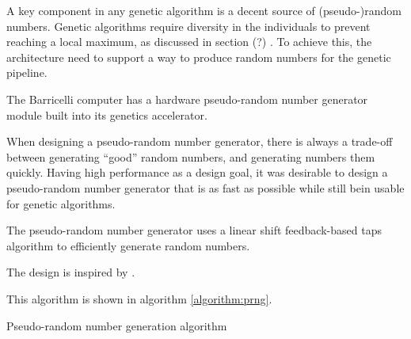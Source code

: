 A key component in any genetic algorithm is a decent source of (pseudo-)random numbers.
Genetic algorithms require diversity in the individuals to prevent reaching a local maximum, as discussed in section (?) . 
To achieve this, the architecture need to support a way to produce random numbers for the genetic pipeline.   

The Barricelli computer has a hardware pseudo-random number generator module built into its genetics accelerator.

When designing a pseudo-random number generator, there is always a trade-off between generating ``good'' random numbers, and generating numbers them quickly.
Having high performance as a design goal\cn, it was desirable to design a pseudo-random number generator that is as fast as possible while still bein usable for genetic algorithms.

The pseudo-random number generator uses a linear shift feedback-based taps algorithm to efficiently generate random numbers.

The design is inspired by .

This algorithm is shown in algorithm \vref{algorithm:prng}.

\begin{algorithm}[H]
\SetAlgoLined
\DontPrintSemicolon
{}
\caption{Pseudo-random number generation algorithm}
\label{algorithm:prng}
\end{algorithm}

